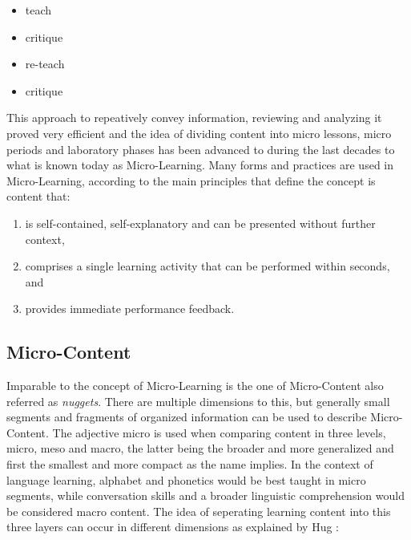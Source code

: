 \begin{itemize}
    \item teach
    \item critique
    \item re-teach
    \item critique
\end{itemize}

This approach to repeatively convey information, reviewing and analyzing it proved
very efficient and the idea of dividing content into micro lessons, micro periods and
laboratory phases has been advanced to during the last decades to what is known today
as Micro-Learning. 
Many forms and practices are used in Micro-Learning, according to 
\cite{webservicearchitectureforsocialmicrolearning} the main 
principles that define the concept is content that:

\begin{enumerate}
    \item is self-contained, self-explanatory and can be presented without further context,
    \item comprises a single learning activity that can be performed within seconds, and
    \item provides immediate performance feedback.
\end{enumerate}

\subsection{Micro-Content}

Imparable to the concept of Micro-Learning is the one of Micro-Content also referred as
\textit{nuggets}. There are 
multiple dimensions to this, but generally small segments and fragments of organized
information can be used to describe Micro-Content.
The adjective micro is used when comparing content in three levels, micro, meso and
macro, the latter being the broader and more generalized and first the smallest and 
more compact as the name implies. In the context of language learning, alphabet and
phonetics would be best taught in micro segments, while conversation skills and 
a broader linguistic comprehension would be considered macro content.
The idea of seperating learning content into this three layers can occur in different
dimensions as explained by Hug \cite{microlearningdimensions}:

